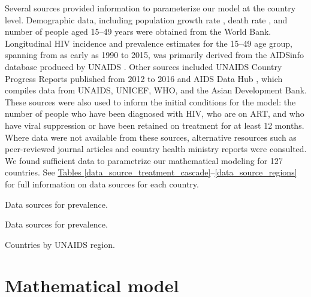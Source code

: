 \documentclass[11pt]{article}
\begin{document}
Several sources provided information to parameterize our model at the
country level. Demographic data, including population growth rate
\cite{WorldBankpg}, death rate
\cite{World_Development_Indicators2013-ee}, and number of people aged
15--49 years \cite{The_World_Bank2016-fd} were obtained from the World
Bank. Longitudinal HIV incidence and prevalence estimates for the
15--49 age group, spanning from as early as 1990 to 2015, was
primarily derived from the AIDSinfo database produced by UNAIDS
\cite{Unaids2016-an}. Other sources included UNAIDS Country Progress
Reports \cite{Unaids2016-am} published from 2012 to 2016 and AIDS Data
Hub \cite{AIDSdatahub-fg}, which compiles data from UNAIDS, UNICEF,
WHO, and the Asian Development Bank. These sources were also used to
inform the initial conditions for the model: the number of people who
have been diagnosed with HIV, who are on ART, and who have viral
suppression or have been retained on treatment for at least 12
months. Where data were not available from these sources, alternative
resources such as peer-reviewed journal articles and country health
ministry reports were consulted.  We found sufficient data to
parametrize our mathematical modeling for 127 countries.  See
\hyperref[data_source_treatment_cascade]{Tables
  \ref*{data_source_treatment_cascade}}--\ref{data_source_regions} for
full information on data sources for each country.

  \centering
  

\begin{table}
  \centering
  \tiny
  \caption{Data sources for prevalence.}
  \label{data_source_prevalence}
\end{table}

\begin{table}
  \centering
  \tiny
  \caption{Data sources for prevalence.}
  \label{data_source_incidence}
\end{table}

\begin{table}
  \centering
  \tiny
  \caption{Countries by UNAIDS region.}
  \label{data_source_regions}
\end{table}


\section{Mathematical model}
\end{document}
